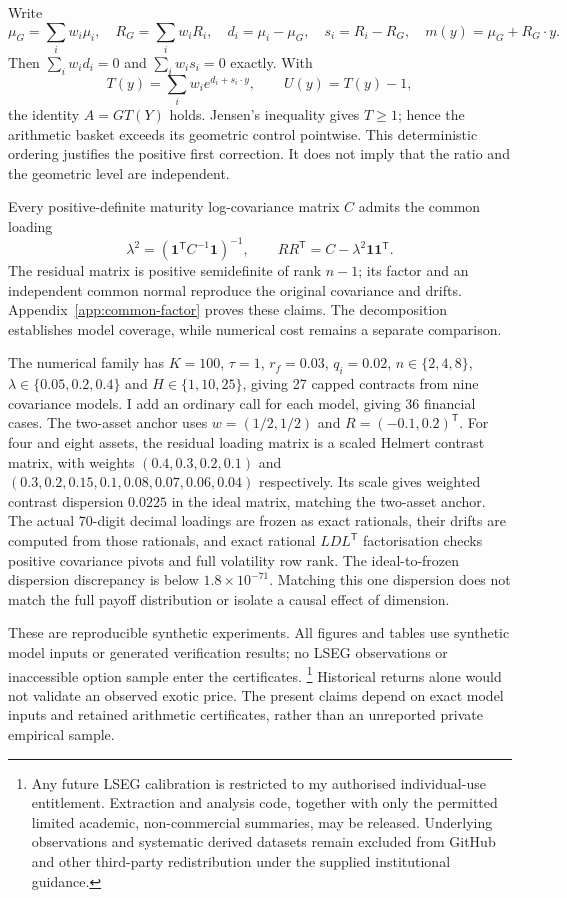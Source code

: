 \documentclass[11pt]{article}
\begin{document}
Write
\begin{equation}
 \mu_G=\sum_iw_i\mu_i,\quad R_G=\sum_iw_iR_i,\quad
 d_i=\mu_i-\mu_G,\quad s_i=R_i-R_G,
 \quad m(y)=\mu_G+R_G\cdot y.
 \label{eq:geometry}
\end{equation}
Then $\sum_iw_id_i=0$ and $\sum_iw_is_i=0$ exactly.  With
\begin{equation}
 T(y)=\sum_iw_ie^{d_i+s_i\cdot y},\qquad U(y)=T(y)-1,
 \label{eq:ratio}
\end{equation}
the identity $A=GT(Y)$ holds.  Jensen's inequality gives $T\geq1$;
hence the arithmetic basket exceeds its geometric control pointwise.
This deterministic ordering justifies the positive first correction.
It does not imply that the ratio and the geometric level are independent.

Every positive-definite maturity log-covariance matrix $C$ admits the
common loading
\begin{equation}
\lambda^2=(\mathbf1^{\mathsf T}C^{-1}\mathbf1)^{-1},\qquad
RR^{\mathsf T}=C-\lambda^2\mathbf1\mathbf1^{\mathsf T}.
\end{equation}
The residual matrix is positive semidefinite of rank $n-1$; its factor and
an independent common normal reproduce the original covariance and
drifts. Appendix~\ref{app:common-factor} proves these claims. The
decomposition establishes model coverage, while numerical cost remains
a separate comparison.

The numerical family has $K=100$, $\tau=1$, $r_f=0.03$, $q_i=0.02$,
$n\in\{2,4,8\}$, $\lambda\in\{0.05,0.2,0.4\}$ and
$H\in\{1,10,25\}$, giving 27 capped contracts from nine covariance models.
I add an ordinary call for each model, giving 36 financial cases.
The two-asset anchor uses $w=(1/2,1/2)$ and $R=(-0.1,0.2)^{\mathsf T}$.
For four and eight assets, the residual loading matrix is a scaled Helmert
contrast matrix, with weights
$(0.4,0.3,0.2,0.1)$ and
$(0.3,0.2,0.15,0.1,0.08,0.07,0.06,0.04)$ respectively.
Its scale gives weighted contrast dispersion $0.0225$ in the ideal matrix,
matching the two-asset anchor.  The actual 70-digit decimal loadings are
frozen as exact rationals, their drifts are computed from those rationals,
and exact rational $LDL^{\mathsf T}$ factorisation checks positive
covariance pivots and full volatility row rank.  The ideal-to-frozen
dispersion discrepancy is below $1.8\times10^{-71}$.
Matching this one dispersion does not match the full payoff distribution
or isolate a causal effect of dimension.

These are reproducible synthetic experiments. All figures and tables use
synthetic model inputs or generated verification results; no LSEG
observations or inaccessible option sample enter the certificates.
\footnote{Any future LSEG calibration is restricted to my authorised
individual-use entitlement. Extraction and analysis code, together with
only the permitted limited academic, non-commercial summaries, may be
released. Underlying observations and systematic derived datasets remain
excluded from GitHub and other third-party redistribution under the
supplied institutional guidance.}
Historical returns alone would not validate an observed exotic price.
The present claims depend on exact model inputs and retained arithmetic
certificates, rather than an unreported private empirical sample.
\end{document}
